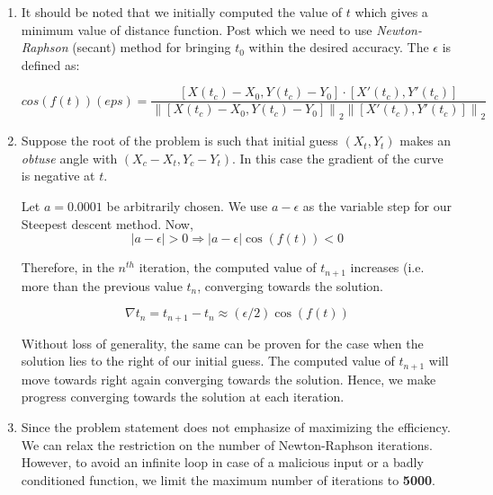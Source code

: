 \documentclass[12pt]{article}
\begin{document}
\begin{enumerate}
    \item 
    It should be noted that we initially computed the value of $t$ which gives a minimum value of distance function. Post which we need to use \textit{Newton-Raphson} (secant) method for bringing $t_0$ within the desired accuracy. The $\epsilon$ is defined as:
    
    \begin{equation}
        cos(f(t)) (eps) =
        \frac{[X(t_c) - X_0, Y(t_c) - Y_0] \cdot [X'(t_c), Y'(t_c)]}{\left\lVert [X(t_c) - X_0, Y(t_c) - Y_0]\right\rVert_2 \left\lVert [X'(t_c), Y'(t_c)]\right\rVert_2}
    \end{equation}
    
	\item
	  Suppose the root of the problem is such that initial guess $(X_t, Y_t)$ makes an \textit{obtuse} angle with $(X_c - X_t, Y_c - Y_t)$. In this case the gradient of the curve is negative at $t$.
	  
	 Let $a = 0.0001$ be arbitrarily chosen. We use $a - \epsilon$ as the variable step for our Steepest descent method. Now,
    \begin{equation}
        |a - \epsilon| > 0 
        \Rightarrow |a - \epsilon|\cos(f(t)) < 0
    \end{equation}
    
    Therefore, in the $n^{th}$ iteration, the computed value of $t_{n+1}$ increases (i.e. more than the previous value $t_n$, converging towards the solution.
    
    \begin{equation}
        \nabla t_n  = t_{n+1} - t_n \approx (\epsilon/2)\cos(f(t))
    \end{equation}
    
    Without loss of generality, the same can be proven for the case when the solution lies to the right of our initial guess. The computed value of $t_{n+1}$ will move towards right again converging towards the solution.
    Hence, we make progress converging towards the solution at each iteration.
    
        
    \item 
    Since the problem statement does not emphasize of maximizing the efficiency. We can relax the restriction on the number of Newton-Raphson iterations. However, to avoid an infinite loop in case of a malicious input or a badly conditioned function, we limit the maximum number of iterations to \textbf{5000}.
    
\end{enumerate}
\end{document}
